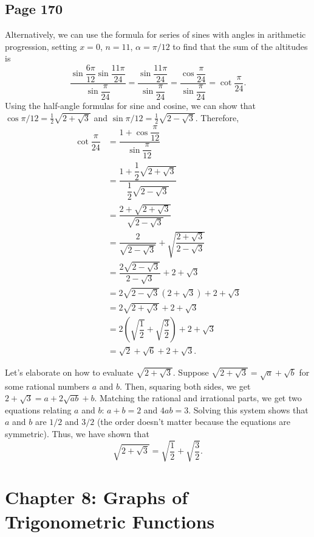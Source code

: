 \documentclass{article}
\newenvironment{solutions}[1]
{\subsection*{#1}
 \begin{enumerate}[leftmargin=1.5em]}
{\end{enumerate}}
\begin{document}
\begin{solutions}{Page 170}
Alternatively, we can use the formula for series of sines with angles in arithmetic progression, setting $x=0$, $n=11$, $\alpha = \pi / 12$ to find that the sum of the altitudes is
\[
\dfrac{\sin{\dfrac{6\pi}{12}}\sin{\dfrac{11\pi}{24}}}{\sin{\dfrac{\pi}{24}}} = \dfrac{\sin{\dfrac{11\pi}{24}}}{\sin{\dfrac{\pi}{24}}} = \dfrac{\cos{\dfrac{\pi}{24}}}{\sin{\dfrac{\pi}{24}}} = \cot{\dfrac{\pi}{24}}.
\]
Using the half-angle formulas for sine and cosine, we can show that $\cos{\pi/12} = \tfrac{1}{2}\sqrt{2+\sqrt{3}}$ and $\sin{\pi/12} = \tfrac{1}{2}\sqrt{2-\sqrt{3}}$. Therefore,
\begin{align*}
\cot{\dfrac{\pi}{24}} &= \dfrac{1+\cos{\dfrac{\pi}{12}}}{\sin{\dfrac{\pi}{12}}} \\
&= \dfrac{1+\dfrac{1}{2}\sqrt{2+\sqrt{3}}}{\dfrac{1}{2}\sqrt{2-\sqrt{3}}} \\
&= \dfrac{2+\sqrt{2+\sqrt{3}}}{\sqrt{2-\sqrt{3}}} \\
&= \dfrac{2}{\sqrt{2-\sqrt{3}}} + \sqrt{\dfrac{2+\sqrt{3}}{2-\sqrt{3}}} \\
&= \dfrac{2\sqrt{2-\sqrt{3}}}{2-\sqrt{3}} + 2  + \sqrt{3} \\
&=2\sqrt{2-\sqrt{3}}\left(2+\sqrt{3}\right) + 2  + \sqrt{3} \\
&= 2\sqrt{2+\sqrt{3}} + 2  + \sqrt{3} \\
&= 2\left(\sqrt{\dfrac{1}{2}} + \sqrt{\dfrac{3}{2}}\right) + 2  + \sqrt{3} \\
&= \sqrt{2} + \sqrt{6} + 2 + \sqrt{3}.
\end{align*}

Let's elaborate on how to evaluate $\sqrt{2+\sqrt{3}}$. Suppose $\sqrt{2+\sqrt{3}} = \sqrt{a} + \sqrt{b}$ for some rational numbers $a$ and $b$. Then, squaring both sides, we get $2+\sqrt{3} = a+2\sqrt{ab}+b$. Matching the rational and irrational parts, we get two equations relating $a$ and $b$: $a+b=2$ and $4ab=3$. Solving this system shows that $a$ and $b$ are $1/2$ and $3/2$ (the order doesn't matter because the equations are symmetric). Thus, we have shown that
\[
\sqrt{2+\sqrt{3}} = \sqrt{\dfrac{1}{2}} + \sqrt{\dfrac{3}{2}}.
\]
\end{solutions}

\section*{Chapter 8: Graphs of Trigonometric Functions}
\end{document}
